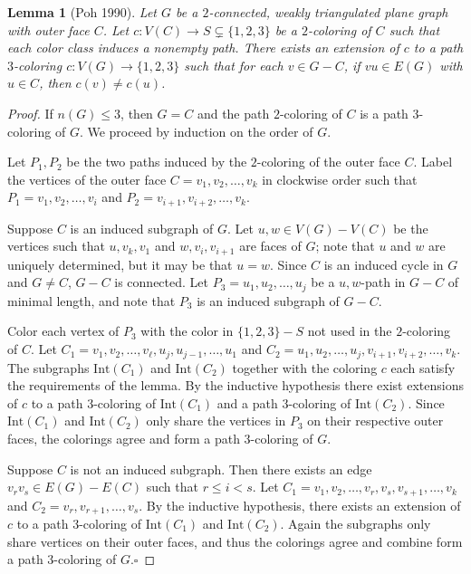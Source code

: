\documentclass[12pt,letterpaper]{article}
\theoremstyle{plain}
\newtheorem{lemma}{Lemma}[section]           %
\theoremstyle{definition}
\theoremstyle{break}
\newcommand{\ggcqedsymbol}{$\square$}
\newcommand{\ggcqed}{\hbox{}\nobreak\hbox{\quad\ggcqedsymbol}}
\newcommand{\ggcnopf}{\ggcqed}
\begin{document}
\begin{lemma}[Poh 1990]\label{L:planar3c}
Let $G$ be a $2$-connected, weakly triangulated plane graph with outer face
$C$. Let $c:V(C)\to S\subsetneq\{1,2,3\}$ be a $2$-coloring of $C$ such
that each color class induces a nonempty path. There exists an extension of
$c$ to a path $3$-coloring $c:V(G)\to\{1,2,3\}$ such that for each $v\in G-C$, if $vu\in
E(G)$ with $u\in C$, then $c(v)\ne c(u)$.
\end{lemma}

\begin{proof}
If $n(G)\le 3$, then $G=C$ and the path $2$-coloring of $C$ is a path
$3$-coloring of $G$. We proceed by induction on the order of $G$. 

Let $P_1,P_2$ be the two paths induced by the $2$-coloring of the outer face
$C$. 
Label the vertices of the outer face $C=v_1,v_2,\ldots, v_k$ in clockwise
order such that $P_1=v_1,v_2,\ldots, v_i$ and
$P_2=v_{i+1},v_{i+2},\ldots, v_k$.

Suppose $C$ is an induced subgraph of $G$. Let
$u,w\in V(G)-V(C)$ be the vertices such that $u,v_k,v_1$ and $w,v_i,v_{i+1}$
are faces of $G$; note that
$u$ and $w$ are uniquely determined, but it may be that $u=w$. Since
$C$ is an induced cycle in $G$ and $G\ne C$, $G-C$ is connected.
Let $P_3=u_1,u_2,\ldots,u_j$ be a $u,w$-path in $G-C$ of minimal length, and
note that $P_3$ is an induced subgraph of $G-C$.

Color each vertex of $P_3$ with the color in $\{1,2,3\}- S$ not used
in the $2$-coloring of
$C$. Let $C_1=v_1,v_2,\ldots,v_\ell,u_j,u_{j-1},\ldots,u_1$ and
$C_2=u_1,u_2,\ldots,u_j,v_{i+1},v_{i+2},\ldots,v_k$. The subgraphs
$\text{Int}(C_1)$ and $\text{Int}(C_2)$ together with the coloring $c$
each satisfy the requirements of the lemma. By the inductive hypothesis
there exist extensions of $c$ to a path
$3$-coloring of $\text{Int}(C_1)$ and a path $3$-coloring of $\text{Int}(C_2)$.
Since $\text{Int}(C_1)$ and $\text{Int}(C_2)$ only share the vertices in $P_3$
on their respective outer faces, the colorings agree and form a path
$3$-coloring of $G$.

Suppose $C$ is not an induced subgraph. Then there
exists an edge $v_rv_s\in E(G)-E(C)$ such that $r\le i < s$. Let
$C_1=v_1,v_2,\ldots,v_r,v_s,v_{s+1},\ldots,v_k$
and $C_2=v_r,v_{r+1},\ldots,v_s$.
By the inductive hypothesis, there exists an extension of $c$ to a path
$3$-coloring of $\text{Int}(C_1)$ and $\text{Int}(C_2)$. Again
the subgraphs only share vertices on their outer faces, and thus the
colorings agree and combine form a path $3$-coloring of $G$.\ggcnopf
\end{proof}
\end{document}
